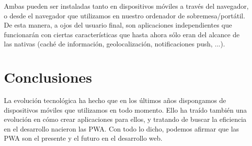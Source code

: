 \documentclass{\ClassPath/viu-tfm-template}
\begin{document}
Ambas pueden ser instaladas tanto en dispositivos móviles a través del navegador, o desde el navegador que utilizamos en nuestro ordenador de sobremesa/portátil. De esta manera, a ojos del usuario final, son aplicaciones independientes que funcionarán con ciertas características que hasta ahora sólo eran del alcance de las nativas (caché de información, geolocalización, notificaciones push, ...).

\chapter{Conclusiones}
La evolución tecnológica ha hecho que en los últimos años dispongamos de dispositivos móviles que utilizamos en todo momento. Ello ha traído también una evolución en cómo crear aplicaciones para ellos, y tratando de buscar la eficiencia en el desarrollo nacieron las PWA.
Con todo lo dicho, podemos afirmar que las PWA son el presente y el futuro en el desarrollo web.

\printbibliography[title={Referencias bibliográficas},heading=bibintoc]
\end{document}
